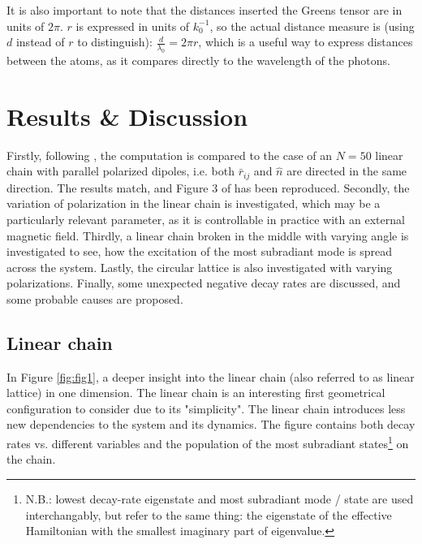 \documentclass{article}
\begin{document}
It is also important to note that the distances inserted the Greens tensor are in units of $2\pi$. $r$ is expressed in units of $k_0^{-1}$, so the actual distance measure is (using $d$ instead of $r$ to distinguish): $\frac{d}{\lambda_0} = 2 \pi r$, which is a useful way to express distances between the atoms, as it compares directly to the wavelength of the photons. 

\section{Results \& Discussion}\label{sec:results}

Firstly, following \cite{Asenjo}, the computation is compared to the case of an $N=50$ linear chain with parallel polarized dipoles, i.e. both $\bar{r}_{ij}$ and $\hat{n}$ are directed in the same direction. The results match, and Figure 3 of \cite{Asenjo} has been reproduced. Secondly, the variation of polarization in the linear chain is investigated, which may be a particularly relevant parameter, as it is controllable in practice with an external magnetic field. Thirdly, a linear chain broken in the middle with varying angle is investigated to see, how the excitation of the most subradiant mode is spread across the system. Lastly, the circular lattice is also investigated with varying polarizations. Finally, some unexpected negative decay rates are discussed, and some probable causes are proposed. 

\subsection{Linear chain}\label{disc:linear_chain}

In Figure \ref{fig:fig1}, a deeper insight into the linear chain (also referred to as linear lattice) in one dimension. The linear chain is an interesting first geometrical configuration to consider due to its "simplicity". The linear chain introduces less new dependencies to the system and its dynamics. The figure contains both decay rates vs. different variables and the population of the most subradiant states\footnote{N.B.: lowest decay-rate eigenstate and most subradiant mode / state are used interchangably, but refer to the same thing: the eigenstate of the effective Hamiltonian with the smallest imaginary part of eigenvalue.} on the chain. 
\end{document}
